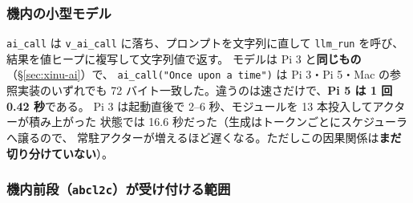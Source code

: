 \documentclass[11pt,a4paper]{ltjsarticle}
\begin{document}
\subsubsection*{機内の小型モデル}

\texttt{ai\_call} は \texttt{v\_ai\_call} に落ち、プロンプトを文字列に直して
\texttt{llm\_run} を呼び、結果を値ヒープに複写して文字列値で返す。
モデルは Pi 3 と\textbf{同じもの}（\S\ref{sec:xinu-ai}）で、
\texttt{ai\_call("Once upon a time")} は Pi 3・Pi 5・Mac の参照実装のいずれでも
72 バイト一致した。違うのは速さだけで、\textbf{Pi 5 は 1 回 0.42 秒}である。
Pi 3 は起動直後で 2--6 秒、モジュールを 13 本投入してアクターが積み上がった
状態では 16.6 秒だった（生成はトークンごとにスケジューラへ譲るので、
常駐アクターが増えるほど遅くなる。ただしこの因果関係は\textbf{まだ切り分けていない}）。

\subsubsection*{機内前段（\texttt{abcl2c}）が受け付ける範囲}
\end{document}

